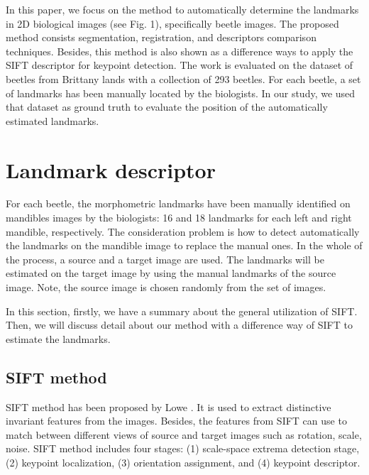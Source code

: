 \documentclass{gretsi}
\begin{document}
In this paper, we focus on the method to automatically determine the landmarks in 2D biological images (see Fig. 1), specifically beetle images. The proposed method consists segmentation, registration, and descriptors comparison techniques. Besides, this method is also shown as a difference ways to apply the SIFT descriptor for keypoint detection. The work is evaluated on the dataset of beetles from Brittany lands with a collection of 293 beetles. For each beetle, a set of landmarks has been manually located by the biologists. In our study, we used that dataset as ground truth to evaluate the position of the automatically estimated landmarks.
\section{Landmark descriptor}
For each beetle, the morphometric landmarks have been manually identified on mandibles images by the biologists: 16 and 18 landmarks for each left and right mandible, respectively. The consideration problem is how to detect automatically the landmarks on the mandible image to replace the manual ones. In the whole of the process, a source and a target image are used. The landmarks will be estimated on the target image by using the manual landmarks of the source image. Note, the source image is chosen randomly from the set of images.

In this section, firstly, we have a summary about the general utilization of SIFT. Then, we will discuss detail about our method with a difference way of SIFT to estimate the landmarks.
\subsection{SIFT method}
\label{secSIFT}
SIFT method has been proposed by Lowe \cite{lowe1999object, lowe2004distinctive}. It is used to extract distinctive invariant features from the images. Besides, the features from SIFT can use to match between different views of source and target images such as rotation, scale, noise. SIFT method includes four stages: (1) scale-space extrema detection stage, (2) keypoint localization, (3) orientation assignment, and (4) keypoint descriptor.
\end{document}
